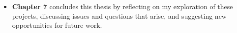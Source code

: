 \begin{itemize}


  \item \textbf{Chapter 7} concludes this thesis by reflecting on my exploration of these projects, discussing issues and questions that arise, and suggesting new opportunities for future work.
\end{itemize}